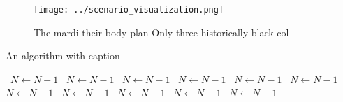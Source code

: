 \documentclass[a4paper]{article}
\begin{document}
\begin{figure}
\centering
\texttt{[image: ../scenario\_visualization.png]}
\caption{The mardi their body plan Only three historically black col
}
\end{figure}
 
\begin{algorithm}
\caption{An algorithm with caption}
\begin{algorithmic}
\    \State $N \gets N - 1$
\    \State $N \gets N - 1$
\    \State $N \gets N - 1$
\    \State $N \gets N - 1$
\    \State $N \gets N - 1$
\    \State $N \gets N - 1$
\    \State $N \gets N - 1$
\    \State $N \gets N - 1$
\    \State $N \gets N - 1$
\    \State $N \gets N - 1$
\    \State $N \gets N - 1$
\EndWhile
\end{algorithmic}
\end{algorithm}
\end{document}
